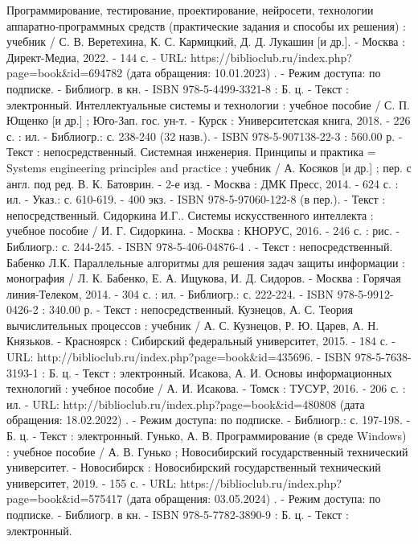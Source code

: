 \begin{thebibliography}{50}
     Программирование, тестирование, проектирование, нейросети, технологии аппаратно‐программных средств (практические задания и способы их решения) : учебник / С. В. Веретехина, К. С. Кармицкий, Д. Д. Лукашин [и др.]. - Москва : Директ-Медиа, 2022. - 144 с. - URL: https://biblioclub.ru/index.php?page=book\&id=694782 (дата обращения: 10.01.2023) . - Режим доступа: по подписке. - Библиогр. в кн. - ISBN 978-5-4499-3321-8 : Б. ц. - Текст : электронный.
     Интеллектуальные системы и технологии : учебное пособие / С. П. Ющенко [и др.] ; Юго-Зап. гос. ун-т. - Курск : Университетская книга, 2018. - 226 с. : ил. - Библиогр.: с. 238-240 (32 назв.). - ISBN 978-5-907138-22-3 : 560.00 р. - Текст : непосредственный.
    \bibitem{} Системная инженерия. Принципы и практика = Systems engineering principles and practice : учебник / А. Косяков [и др.] ; пер. с англ. под ред. В. К. Батоврин. - 2-е изд. - Москва : ДМК Пресс, 2014. - 624 с. : ил. - Указ.: с. 610-619. - 400 экз. - ISBN 978-5-97060-122-8 (в пер.). - Текст : непосредственный.
    \bibitem{} Сидоркина И.Г..   Системы искусственного интеллекта : учебное пособие / И. Г. Сидоркина. - Москва : КНОРУС, 2016. - 246 с. : рис. - Библиогр.: с. 244-245. - ISBN 978-5-406-04876-4 . - Текст : непосредственный.
    \bibitem{} Бабенко Л.К.   Параллельные алгоритмы для решения задач защиты информации : монография / Л. К. Бабенко, Е. А. Ищукова, И. Д. Сидоров. - Москва : Горячая линия-Телеком, 2014. - 304 с. : ил. - Библиогр.: с. 222-224. - ISBN 978-5-9912-0426-2 : 340.00 р. - Текст : непосредственный.
    \bibitem{} Кузнецов, А. С.    Теория вычислительных процессов  : учебник / А. С. Кузнецов, Р. Ю. Царев, А. Н. Князьков. - Красноярск : Сибирский федеральный университет, 2015. - 184 с. - URL: http://biblioclub.ru/index.php?page=book\&id=435696. - ISBN 978-5-7638-3193-1 : Б. ц.  - Текст : электронный.
    \bibitem{} Исакова, А. И.    Основы информационных технологий : учебное пособие / А. И. Исакова. - Томск : ТУСУР, 2016. - 206 с. : ил. - URL: http://biblioclub.ru/index.php?page=book\&id=480808 (дата обращения: 18.02.2022) . - Режим доступа: по подписке. - Библиогр.: с. 197-198. - Б. ц. - Текст : электронный.
    \bibitem{} Гунько, А. В.    Программирование (в среде Windows) : учебное пособие / А. В. Гунько ; Новосибирский государственный технический университет. - Новосибирск : Новосибирский государственный технический университет, 2019. - 155 с. - URL: https://biblioclub.ru/index.php?page=book\&id=575417 (дата обращения: 03.05.2024) . - Режим доступа: по подписке. - Библиогр. в кн. - ISBN 978-5-7782-3890-9 : Б. ц. - Текст : электронный.

\end{thebibliography}
